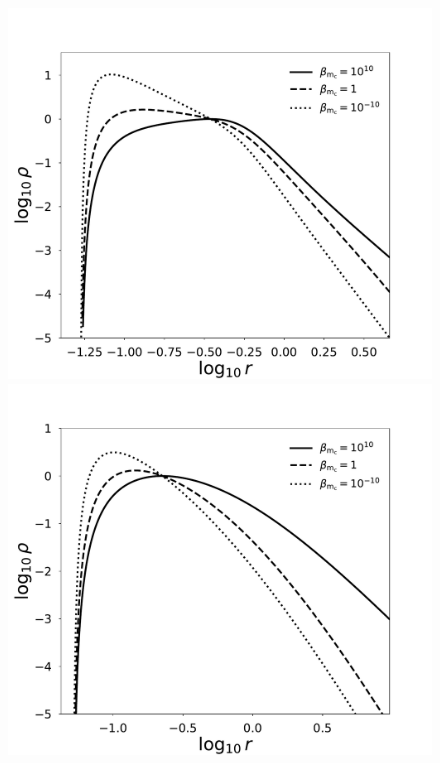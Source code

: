 \documentclass[twocolumn,aps,showpacs,showkeys,prd,superscriptaddress,byrevtex, amsmath]{revtex4-1}
\begin{document}
\begin{figure}
\includegraphics[scale=0.22]{figures/radial_log_rho_model_VII.pdf}
\hspace{-0.6cm}
\\
\hspace{-0.6cm}
\includegraphics[scale=0.22]{figures/log_radial_log_rho_I_ADM.pdf}
\hspace{-0.6cm}

\end{figure}
\end{document}

